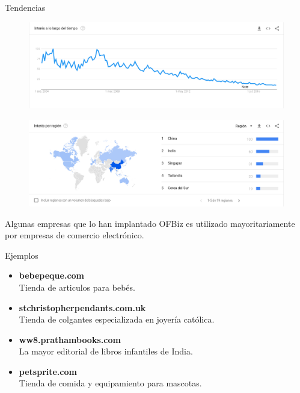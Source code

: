 \begin{frame}{Tendencias}
	\begin{figure}[H]
		\centering
		\includegraphics[width=1.0\linewidth]{img/tendencia_tiempo.png}
	\end{figure}
	\begin{figure}[H]
		\centering
		\includegraphics[width=1.0\linewidth]{img/tendencia_lugar.png}
	\end{figure}
\end{frame}

\begin{frame}{Algunas empresas que lo han implantado}
	OFBiz es utilizado mayoritariamente por empresas de comercio electrónico.\\

	\begin{block}{Ejemplos}
		\begin{itemize}
			\item \textbf{bebepeque.com} \\
				Tienda de articulos para bebés.
			\item \textbf{stchristopherpendants.com.uk} \\
				Tienda de colgantes especializada en joyería católica.
			\item \textbf{ww8.prathambooks.com} \\
				La mayor editorial de libros infantiles de India.
			\item \textbf{petsprite.com} \\
				Tienda de comida y equipamiento para mascotas.
		\end{itemize}
	\end{block}
\end{frame}

